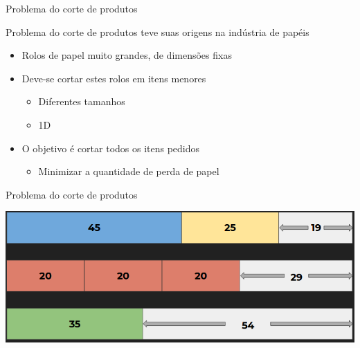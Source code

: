 \documentclass[compress,mathserif]{beamer}
\begin{document}

\begin{frame}{Problema do corte de produtos}

Problema do corte de produtos teve suas origens na indústria de papéis \href{https://neos-guide.org/content/cutting-stock-problem}{}

\begin{itemize}
    \item Rolos de papel muito grandes, de dimensões fixas
    \item Deve-se cortar estes rolos em itens menores
    \begin{itemize}
        \item Diferentes tamanhos
        \item 1D
    \end{itemize}
    \item O objetivo é cortar todos os itens pedidos
    \begin{itemize}
        \item Minimizar a quantidade de perda de papel
    \end{itemize}
\end{itemize}
\end{frame}


\begin{frame}{Problema do corte de produtos}

\vspace{1cm}
\centering \includegraphics[width=\textwidth]{images/cutting_1d.png}

\end{frame}

\end{document}
